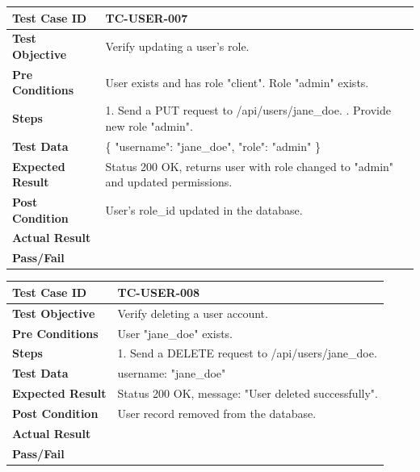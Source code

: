 \begin{longtable}{|p{}|p{}|}
\hline
\textbf{Test Case ID} & TC-USER-007 \\ \hline
\textbf{Test Objective} & Verify updating a user's role. \\ \hline
\textbf{Pre Conditions} & User exists and has role "client". Role "admin" exists. \\ \hline
\textbf{Steps} & 
1. Send a PUT request to /api/users/jane\_doe. \newline
2. Provide new role "admin". \\ \hline
\textbf{Test Data} & \{ "username": "jane\_doe", "role": "admin" \} \\ \hline
\textbf{Expected Result} & Status 200 OK, returns user with role changed to "admin" and updated permissions. \\ \hline
\textbf{Post Condition} & User's role\_id updated in the database. \\ \hline
\textbf{Actual Result} &  \\ \hline
\textbf{Pass/Fail} &  \\ \hline
\end{longtable}

\begin{longtable}{|p{}|p{}|}
\hline
\textbf{Test Case ID} & TC-USER-008 \\ \hline
\textbf{Test Objective} & Verify deleting a user account. \\ \hline
\textbf{Pre Conditions} & User "jane\_doe" exists. \\ \hline
\textbf{Steps} & 
1. Send a DELETE request to /api/users/jane\_doe. \\ \hline
\textbf{Test Data} & username: "jane\_doe" \\ \hline
\textbf{Expected Result} & Status 200 OK, message: "User deleted successfully". \\ \hline
\textbf{Post Condition} & User record removed from the database. \\ \hline
\textbf{Actual Result} &  \\ \hline
\textbf{Pass/Fail} &  \\ \hline
\end{longtable}